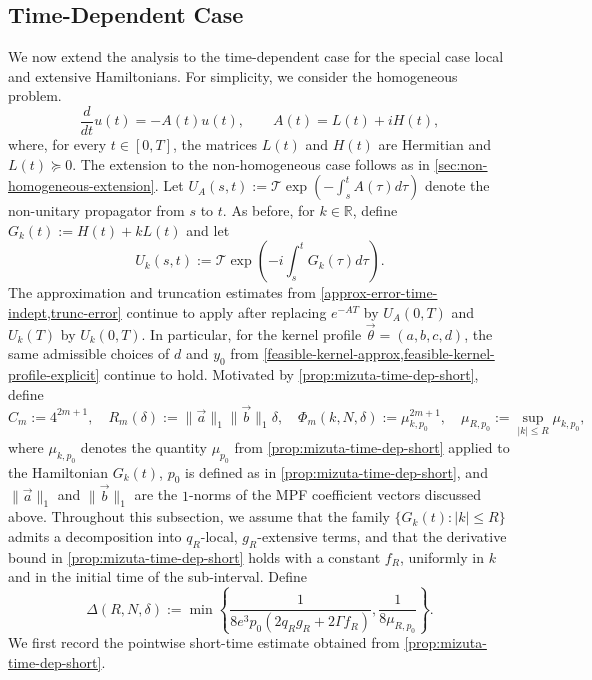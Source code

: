 \documentclass[10pt,reqno]{article}
\numberwithin{equation}{section}
\theoremstyle{plain}
\theoremstyle{definition}
\begin{document}
\subsection{Time-Dependent Case}\label{sec:time-dependent-extension}
We now extend the analysis to the time-dependent case for the special case local and extensive Hamiltonians. For simplicity, we consider the homogeneous problem.
\begin{equation}\label{eq:td-homogeneous-problem}
\frac{d}{dt}u(t) = -A(t)u(t), \qquad A(t) = L(t) + iH(t),
\end{equation}
where, for every \(t \in [0,T]\), the matrices \(L(t)\) and \(H(t)\) are Hermitian and \(L(t) \succeq 0\). The extension to the non-homogeneous case follows as in \cref{sec:non-homogeneous-extension}. Let $U_A(s,t) := \mathcal T \exp (-\int_s^t A(\tau) d\tau )$ denote the non-unitary propagator from \(s\) to \(t\). As before, for \(k \in \mathbb R\), define $G_k(t) := H(t) + kL(t)$ and let
\begin{equation}
U_k(s,t) := \mathcal T \exp \left(-i\int_s^t G_k(\tau)d\tau \right).
\end{equation}
The approximation and truncation estimates from \cref{approx-error-time-indept,trunc-error} continue to apply after replacing \(e^{-AT}\) by \(U_A(0,T)\) and \(U_k(T)\) by \(U_k(0,T)\). In particular, for the kernel profile \(\vec{\theta}=(a,b,c,d)\), the same admissible choices of \(d\) and \(y_0\) from \cref{feasible-kernel-approx,feasible-kernel-profile-explicit} continue to hold. Motivated by \cref{prop:mizuta-time-dep-short}, define
\begin{equation}
C_m:=4^{2m+1}, \quad R_m(\delta):=\|\vec a\|_1\|\vec b\|_1\delta, \quad \Phi_m(k,N,\delta) := \mu_{k,p_0}^{2m+1}, \quad \mu_{R,p_0}:=\sup_{|k|\le R}\mu_{k,p_0},
\end{equation}
where \(\mu_{k,p_0}\) denotes the quantity \(\mu_{p_0}\) from \cref{prop:mizuta-time-dep-short} applied to the Hamiltonian \(G_k(t)\), \(p_0\) is defined as in \cref{prop:mizuta-time-dep-short}, and \(\|\vec a\|_1\) and \(\|\vec b\|_1\) are the $1$-norms of the MPF coefficient vectors discussed above. Throughout this subsection, we assume that the family \(\{G_k(t): |k|\le R\}\) admits a decomposition into \(q_R\)-local, \(g_R\)-extensive terms, and that the derivative bound in \cref{prop:mizuta-time-dep-short} holds with a constant \(f_R\), uniformly in \(k\) and in the initial time of the sub-interval.  Define
\begin{equation}\label{eq:td-admissible-step-size}
\Delta(R,N,\delta):=\min\left\{\frac{1}{8e^3p_0(2q_Rg_R+2\Gamma f_R)}, \frac{1}{8\mu_{R,p_0}} \right\}.
\end{equation}
We first record the pointwise short-time estimate obtained from \cref{prop:mizuta-time-dep-short}.
\end{document}
